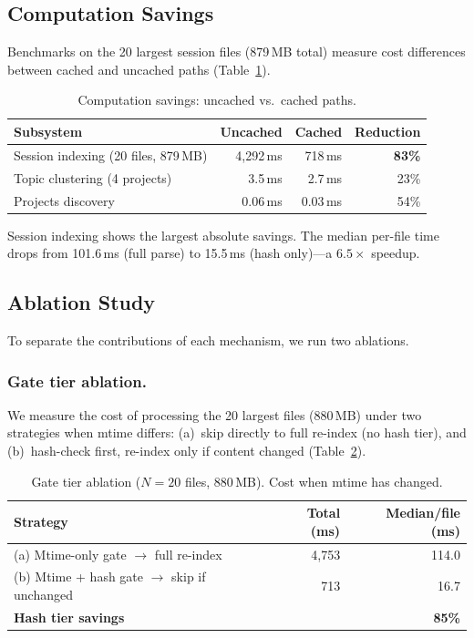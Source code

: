 \documentclass[11pt]{article}
\begin{document}
\subsection{Computation Savings}

Benchmarks on the 20 largest session files (879\,MB total) measure cost differences between cached and uncached paths (Table~\ref{tab:savings}).

\begin{table}[ht]
\centering
\caption{Computation savings: uncached vs.\ cached paths.}
\label{tab:savings}
\begin{tabular}{lrrr}
\toprule
Subsystem & Uncached & Cached & Reduction \\
\midrule
Session indexing (20 files, 879\,MB) & 4,292\,ms & 718\,ms & \textbf{83\%} \\
Topic clustering (4 projects) & 3.5\,ms & 2.7\,ms & 23\% \\
Projects discovery & 0.06\,ms & 0.03\,ms & 54\% \\
\bottomrule
\end{tabular}
\end{table}

Session indexing shows the largest absolute savings. The median per-file time drops from 101.6\,ms (full parse) to 15.5\,ms (hash only)---a $6.5\times$ speedup.

\subsection{Ablation Study}
\label{sec:ablation}

To separate the contributions of each mechanism, we run two ablations.

\subsubsection{Gate tier ablation.} We measure the cost of processing the 20 largest files (880\,MB) under two strategies when mtime differs: (a)~skip directly to full re-index (no hash tier), and (b)~hash-check first, re-index only if content changed (Table~\ref{tab:gate_ablation}).

\begin{table}[ht]
\centering
\caption{Gate tier ablation ($N = 20$ files, 880\,MB). Cost when mtime has changed.}
\label{tab:gate_ablation}
\begin{tabular}{lrr}
\toprule
Strategy & Total (ms) & Median/file (ms) \\
\midrule
(a) Mtime-only gate $\to$ full re-index & 4,753 & 114.0 \\
(b) Mtime + hash gate $\to$ skip if unchanged & 713 & 16.7 \\
\midrule
\textbf{Hash tier savings} & & \textbf{85\%} \\
\bottomrule
\end{tabular}
\end{table}
\end{document}
